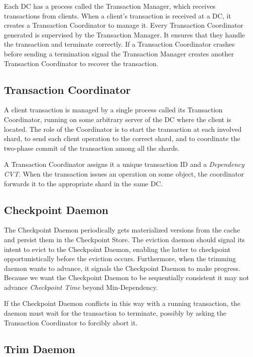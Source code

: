 \documentclass[twoside]{article}
\begin{document}
Each DC has a process called the Transaction Manager, which 
receives transactions from clients.
When a client's transaction is received at a DC, it creates a Transaction
Coordinator to manage it.
Every Transaction Coordinator generated is supervised by the Transaction Manager. 
It ensures that they handle the transaction and terminate correctly.
If a Transaction Coordinator crashes before sending a termination 
signal the Transaction Manager creates another Transaction 
Coordinator to recover the transaction.


\subsection{Transaction Coordinator}
\label{sec:transaction-coordinator}
            
A client transaction is managed by a single process called its
Transaction Coordinator, running on some arbitrary server of the DC
where the client is located.
The role of the Coordinator is to start the transaction at each involved
shard, to send each client operation to the correct shard, and to
coordinate the two-phase commit of the transaction among all the shards.

A Transaction Coordinator assigns it a unique transaction ID and
a \emph{Dependency CVT}.
When the transaction issues an operation on some object, the coordinator
forwards it to the appropriate shard in the same DC.

\subsection{Checkpoint Daemon}
\label{sec:checkpoint-daemon}

The Checkpoint Daemon periodically gets materialized versions from the cache and 
persist them in the Checkpoint Store.
The eviction daemon should signal its intent to evict to the
Checkpoint Daemon, enabling the latter to checkpoint 
opportunistically before the eviction occurs.
Furthermore, when the trimming daemon wants to advance, it signals the
Checkpoint Daemon to make progress.
Because we want the Checkpoint Daemon to be sequentially consistent
it may not advance \emph{Checkpoint Time} beyond Min-Dependency.

If the Checkpoint Daemon conflicts in this way with a running
transaction, the daemon must wait for the transaction to terminate,
possibly by asking the Transaction Coordinator to forcibly abort it.


\subsection{Trim Daemon}
\label{sec:trim-daemon}
\end{document}
